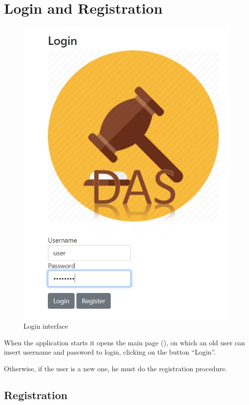 \section{Login and Registration}

\begin{figure}[htb]
	\centering
	\includegraphics[width=\textwidth]{img/login.jpg}
	\caption{Login interface}\label{fig:login}
\end{figure}

When the application starts it opens the main page (), on
which an old user can insert username and password to login, clicking on the
button ``Login''.

Otherwise, if the user is a new one, he must do the registration procedure.

\subsection{Registration}

